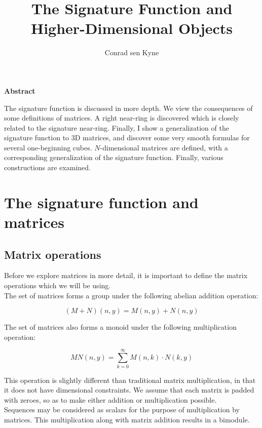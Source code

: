 \documentclass{article}
\title{\Large The Signature Function and Higher-Dimensional Objects}
\author{Conrad sen Kyne}
\date{}
\begin{document}
\maketitle

\begin{center}
\textbf{Abstract}
\end{center}

\noindent The signature function is discussed in more depth. We view the consequences of some definitions of matrices. A right near-ring is discovered which is closely related to the signature near-ring. Finally, I show a generalization of the signature function to 3D matrices, and discover some very smooth formulas for several one-beginning cubes. $N$-dimensional matrices are defined, with a corresponding generalization of the signature function. Finally, various constructions are examined.

\tableofcontents

\pagebreak

\section{The signature function and matrices}

\subsection{Matrix operations}

\noindent Before we explore matrices in more detail, it is important to define the matrix operations which we will be using.\\

\noindent The set of matrices forms a group under the following abelian addition operation:

$$ (M + N) (n, y) = M(n, y) + N(n, y) $$

\noindent The set of matrices also forms a monoid under the following multiplication operation:

$$ MN(n, y) = \sum_{k=0}^{\infty} M(n, k) \cdot N(k, y) $$

\noindent This operation is slightly different than traditional matrix multiplication, in that it does not have dimensional constraints. We assume that each matrix is padded with zeroes, so as to make either addition or multiplication possible. \\

\noindent Sequences may be considered as scalars for the purpose of multiplication by matrices. This multiplication along with matrix addition results in a bimodule.
\end{document}
